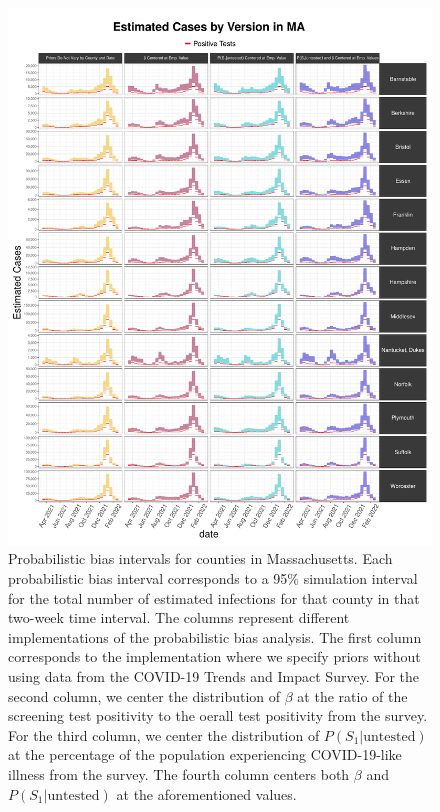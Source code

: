 \documentclass[12pt,twoside]{smiththesis}
\begin{document}
\begin{figure}
\includegraphics[width=1\linewidth]{figure/ma_pb_compared_to_observed} \caption{\label{fig:pb_counts_ma}Probabilistic bias intervals for counties in Massachusetts. Each probabilistic bias interval corresponds to a 95\% simulation interval for the total number of estimated infections for that county in that two-week time interval. The columns represent different implementations of the probabilistic bias analysis. The first column corresponds to the implementation where we specify priors without using data from the COVID-19 Trends and Impact Survey. For the second column, we center the distribution of $\beta$ at the ratio of the screening test positivity to the oerall test positivity from the survey. For the third column, we center the distribution of $P(S_1|\text{untested})$ at the percentage of the population experiencing COVID-19-like illness from the survey. The fourth column centers both  $\beta$ and $P(S_1|\text{untested})$ at the aforementioned values.}\label{fig:unnamed-chunk-89}
\end{figure}
\end{document}
